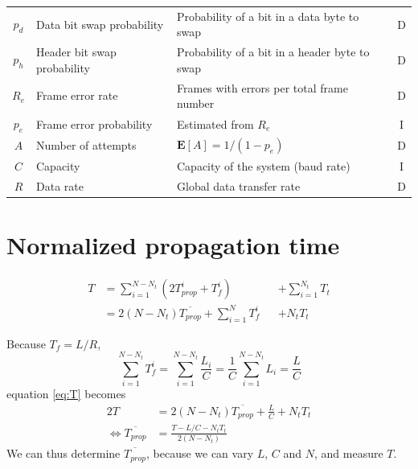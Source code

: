 \documentclass[a4paper, 11pt]{report}
\newcommand\expected[1]{\mathbf{E}[#1]}
\begin{document}
\begin{center}
\begin{tabular}{c | l | p{80mm} | c}
		$p_d$            & Data bit swap probability   & Probability of a bit in a data byte to swap                                        & D   \\
		$p_h$            & Header bit swap probability & Probability of a bit in a header byte to swap                                      & D   \\
		$R_e$            & Frame error rate            & Frames with errors per total frame number                                          & D   \\
		$p_e$            & Frame error probability     & Estimated from $R_e$                                                               & I   \\
		$A$              & Number of attempts          & $\expected{A} = 1/(1-p_e)$                                                         & D   \\
		$C$              & Capacity                    & Capacity of the system (baud rate)                                                 & I   \\
		$R$              & Data rate                   & Global data transfer rate                                                          & D   \\
		\hline \hline
	\end{tabular}
\end{center}

\section{Normalized propagation time}

\begin{equation} \label{eq:T}
\begin{alignedat}{2}
	T & = \sum_{i=1}^{N-N_t}{(2T_{prop}^i + T_f^i)} && + \sum_{i=1}^{N_t}{T_t} \\
	  & = 2 (N-N_t) \overline{T_{prop}} + \sum_{i=1}^{N}{T_f^i} && + N_t T_t
\end{alignedat}
\end{equation}

Because $T_f = L/R$,
\begin{equation} \label{eq:Tfsum}
	\sum_{i=1}^{N-N_t}{T_f^i} = \sum_{i=1}^{N-N_t}{\frac{L_i}{C}} = \frac{1}{C} \sum_{i=1}^{N-N_t}{L_i} = \frac{L}{C}
\end{equation}
equation \ref{eq:T} becomes
\begin{alignat}{2} \label{eq:T2}
	T & = 2 (N-N_t) \overline{T_{prop}} + \frac{L}{C} + N_t T_t \\
	\iff \overline{T_{prop}} & = \frac{T - L/C - N_t T_t}{2 (N-N_t)}
\end{alignat}
We can thus determine $\overline{T_{prop}}$, because we can vary $L$, $C$ and $N$, and measure $T$.
\end{document}
